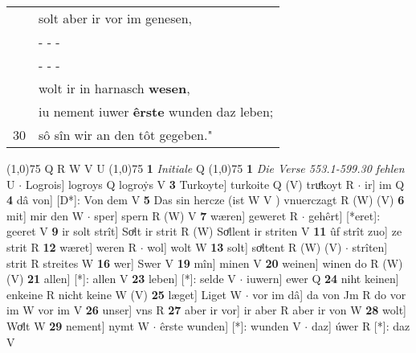 \documentclass[8pt,a4paper,notitlepage]{article}
\begin{document}
\begin{table}[ht]
\begin{minipage}[t]{0.5\linewidth}
\begin{tabular}{rl}
 & solt aber ir vor im genesen,\\ 
 & \multicolumn{1}{l}{ - - - }\\ 
 & \multicolumn{1}{l}{ - - - }\\ 
 & wolt ir in harnasch \textbf{wesen},\\ 
 & iu nement iuwer \textbf{êrste} wunden daz leben;\\ 
30 & sô sîn wir an den tôt gegeben."\\ 
\end{tabular}
\scriptsize
\line(1,0){75} \newline
Q R W V U \newline
\line(1,0){75} \newline
\textbf{1} \textit{Initiale} Q  \newline
\line(1,0){75} \newline
\textbf{1} \textit{Die Verse 553.1-599.30 fehlen} U   $\cdot$ Logrois] logroys Q logroẏs V \textbf{3} Turkoyte] turkoite Q (V) truͦkoyt R  $\cdot$ ir] im Q \textbf{4} dâ von] [D*]: Von dem V \textbf{5} Das sin hercze (ist W V ) vnuerczagt R (W) (V) \textbf{6} mit] mir den W  $\cdot$ sper] spern R (W) V \textbf{7} wæren] geweret R  $\cdot$ gehêrt] [*eret]: geeret V \textbf{9} ir solt strît] Soͯlt ir strit R (W) Soͤllent ir striten V \textbf{11} ûf strît zuo] ze strit R \textbf{12} wæret] weren R  $\cdot$ wol] wolt W \textbf{13} solt] soͯltent R (W) (V)  $\cdot$ strîten] strit R streites W \textbf{16} wer] Swer V \textbf{19} mîn] minen V \textbf{20} weinen] winen do R (W) (V) \textbf{21} allen] [*]: allen V \textbf{23} leben] [*]: selde V  $\cdot$ iuwern] ewer Q \textbf{24} niht keinen] enkeine R nicht keine W (V) \textbf{25} læget] Liget W  $\cdot$ vor im dâ] da von Jm R do vor im W vor im V \textbf{26} unser] vns R \textbf{27} aber ir vor] ir aber R aber ir von W \textbf{28} wolt] Woͤlt W \textbf{29} nement] nymt W  $\cdot$ êrste wunden] [*]: wunden V  $\cdot$ daz] úwer R [*]: daz V \newline
\end{minipage}
\end{table}
\end{document}
